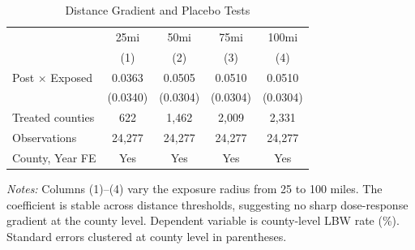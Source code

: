 \begin{table}[t]
\centering
\caption{Distance Gradient and Placebo Tests}
\label{tab:distance}
\begin{tabular}{lcccc}
\toprule
 & 25mi & 50mi & 75mi & 100mi \\
 & (1) & (2) & (3) & (4) \\
\midrule
Post $\times$ Exposed & 0.0363 & 0.0505 & 0.0510 & 0.0510 \\
 & (0.0340) & (0.0304) & (0.0304) & (0.0304) \\
\midrule
Treated counties & 622 & 1,462 & 2,009 & 2,331 \\
Observations & 24,277 & 24,277 & 24,277 & 24,277 \\
County, Year FE & Yes & Yes & Yes & Yes \\
\bottomrule
\end{tabular}
\begin{tablenotes}
\item \textit{Notes:} Columns (1)--(4) vary the exposure radius from 25 to 100 miles. The coefficient is stable across distance thresholds, suggesting no sharp dose-response gradient at the county level. Dependent variable is county-level LBW rate (\%). Standard errors clustered at county level in parentheses.
\end{tablenotes}
\end{table}

